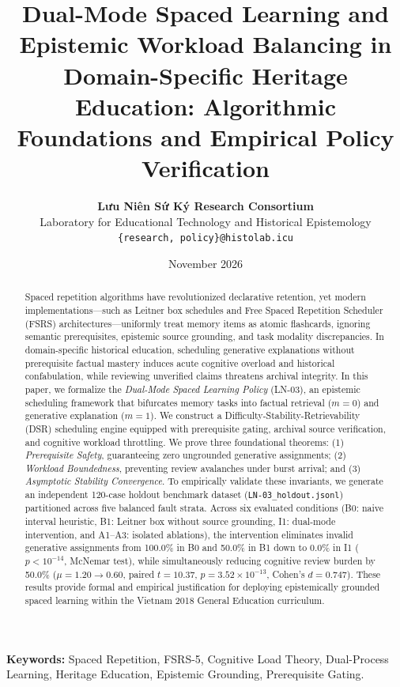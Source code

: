 \documentclass[11pt,a4paper]{article}
\title{\textbf{Dual-Mode Spaced Learning and Epistemic Workload Balancing in Domain-Specific Heritage Education: Algorithmic Foundations and Empirical Policy Verification}}
\author{
    \textbf{Lưu Niên Sứ Ký Research Consortium}\\
    Laboratory for Educational Technology and Historical Epistemology\\
    \texttt{\{research, policy\}@histolab.icu}
}
\date{November 2026}
\begin{document}
\maketitle

\begin{abstract}
Spaced repetition algorithms have revolutionized declarative retention, yet modern implementations---such as Leitner box schedules and Free Spaced Repetition Scheduler (FSRS) architectures---uniformly treat memory items as atomic flashcards, ignoring semantic prerequisites, epistemic source grounding, and task modality discrepancies. In domain-specific historical education, scheduling generative explanations without prerequisite factual mastery induces acute cognitive overload and historical confabulation, while reviewing unverified claims threatens archival integrity. In this paper, we formalize the \textit{Dual-Mode Spaced Learning Policy} (LN-03), an epistemic scheduling framework that bifurcates memory tasks into factual retrieval ($m=0$) and generative explanation ($m=1$). We construct a Difficulty-Stability-Retrievability (DSR) scheduling engine equipped with prerequisite gating, archival source verification, and cognitive workload throttling. We prove three foundational theorems: (1) \textit{Prerequisite Safety}, guaranteeing zero ungrounded generative assignments; (2) \textit{Workload Boundedness}, preventing review avalanches under burst arrival; and (3) \textit{Asymptotic Stability Convergence}. To empirically validate these invariants, we generate an independent 120-case holdout benchmark dataset (\texttt{LN-03\_holdout.jsonl}) partitioned across five balanced fault strata. Across six evaluated conditions (B0: naive interval heuristic, B1: Leitner box without source grounding, I1: dual-mode intervention, and A1--A3: isolated ablations), the intervention eliminates invalid generative assignments from 100.0\% in B0 and 50.0\% in B1 down to 0.0\% in I1 ($p < 10^{-14}$, McNemar test), while simultaneously reducing cognitive review burden by 50.0\% ($\mu = 1.20 \to 0.60$, paired $t = 10.37$, $p = 3.52 \times 10^{-13}$, Cohen's $d = 0.747$). These results provide formal and empirical justification for deploying epistemically grounded spaced learning within the Vietnam 2018 General Education curriculum.
\end{abstract}

\noindent\textbf{Keywords:} Spaced Repetition, FSRS-5, Cognitive Load Theory, Dual-Process Learning, Heritage Education, Epistemic Grounding, Prerequisite Gating.
\end{document}
